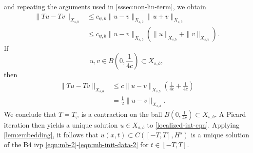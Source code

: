 \documentclass[12pt,reqno]{amsart}
\numberwithin{equation}{section}  %
\numberwithin{figure}{section}
\newcommand{\vp}{\varphi}
\theoremstyle{plain}
\theoremstyle{definition}
\theoremstyle{remark}
\begin{document}
%
and repeating the arguments used in \autoref{sssec:non-lin-term},
we obtain
%
\begin{equation}
	\label{20a}
	\begin{split}
		\|Tu - Tv \|_{X_{s,b}}  
		& \le c_{\psi, b} \|u -v\|_{X_{s,b}} \|u + v \|_{X_{s,b}}
		\\
		& \le c_{\psi, b} \|u -v\|_{X_{s,b}} (\|u\|_{X_{s,b}}+ \|v \|_{X_{s,b}}).
	\end{split}
\end{equation}
%
If $$ u, v \in B(0, \frac{1}{4c}) \subset X_{s,b},$$ then
%
\begin{equation}
	\label{21a}
	\begin{split}
		\|Tu - Tv \|_{X_{s,b}}
		& \le c \|u -v \|_{X_{s,b}} \left( \frac{1}{4c} + 
		\frac{1}{4c} \right)
		\\
		& = \frac{1}{2} \|u -v \|_{X_{s,b}}. 
	\end{split}
\end{equation}
%
We conclude that $T = T_{\vp}$ is a contraction on the ball $B(0, 
\frac{1}{4c}) \subset X_{s,b}$. A Picard iteration then yields a unique solution
$u \in X_{s,b}$ to \eqref{localized-int-eqn}. Applying
\autoref{lem:embedding}, it follows that $u(x,t) \subset C( [-T, T], H^s)$ is a unique
solution of the B4 ivp \eqref{eqn:mb-2}-\eqref{eqn:mb-init-data-2} for $t
\in [-T, T]$.
%
%
\end{document}
